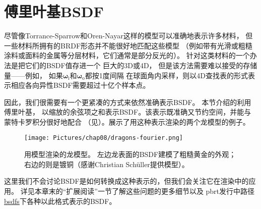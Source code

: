 \section{傅里叶基BSDF}\label{sec:傅里叶基BSDF}
尽管像Torrance-Sparrow和Oren-Nayar这样的模型可以准确地表示许多材料，
但一些材料所拥有的BRDF形态并不能很好地匹配这些模型
（例如带有光滑或粗糙涂料或面料的金属等分层材料，它们通常是部分反光的）。
针对这类材料的一个办法是把它们的BSDF值存进一个
巨大的3D或4D，
但是该方法需要难以接受的存储量——例如，
如果${\bm\omega}_{\mathrm{i}}$和${\bm\omega}_{\mathrm{o}}$都按1度间隔
在球面角内采样，则以4D查找表的形式表示相应各向异性BSDF需要超过十亿个样本点。

因此，我们很需要有一个更紧凑的方式来依然准确表示BSDF。
本节介绍的利用傅里叶基，
以缩放的余弦项之和表示BSDF。该表示既准确又节约空间，并能与蒙特卡罗积分很好地配合
（见）。展示了用这种表示渲染的两个龙模型的例子。
\begin{figure}[htbp]
    \centering
    \texttt{[image: Pictures/chap08/dragons-fourier.png]}
    \caption{用模型渲染的龙模型。
    左边龙表面的BSDF建模了粗糙黄金的外观；右边的则是镀铜（感谢Christian Schüller提供模型）。}
    \label{fig:8.24}
\end{figure}

这里我们不会讨论BSDF是如何转换成这种表示的，但我们会关注它在渲染中的应用。
详见本章末的“扩展阅读”一节了解这些问题的更多细节以及
pbrt发行中路径\href{https://pbrt.org/scenes-v3}{\ttfamily bsdfs}下各种以此格式表示的BSDF。
